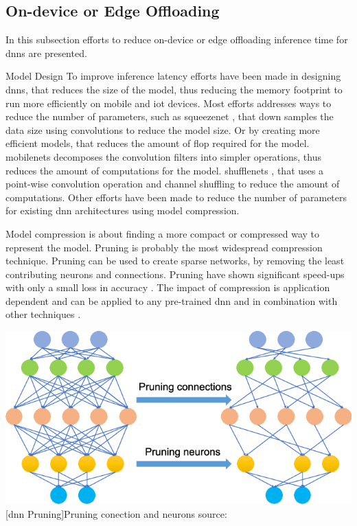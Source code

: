 \subsection{On-device or Edge Offloading}

In this subsection efforts to reduce on-device or edge offloading inference time for \gls{dnn}s are presented.

\begin{enumdescript}
	\item[Model Design] To improve inference latency efforts have been made in designing \gls{dnn}s, that reduces the size of the model, thus reducing the memory footprint to run more efficiently on mobile and \gls{iot} devices. Most efforts addresses ways to reduce the number of parameters, such as \gls{squeezenet} \cite{iandola_squeezenet:_2016}, that down samples the data size using convolutions to reduce the model size. Or by creating more efficient models, that reduces the amount of \gls{flop} required for the model. \gls{mobilenet}s \cite{howard_mobilenets:_2017,sandler_mobilenetv2:_2018} decomposes the convolution filters into simpler operations, thus reduces the amount of computations for the model. \gls{shufflenet}s \cite{zhang_shufflenet:_2017, ma_shufflenet_2018}, that uses a point-wise convolution operation and channel shuffling to reduce the amount of computations. Other efforts have been made to reduce the number of parameters for existing \gls{dnn} architectures using model compression.
	
	\item[Model compression]  is about finding a more compact or compressed way to represent the model. Pruning is probably the most widespread compression technique. Pruning can be used to create sparse networks, by removing the least contributing neurons and connections. Pruning have shown significant speed-ups with only a small loss in accuracy \cite{zhou_edge_2019}. The impact of compression is application dependent and can be applied to any pre-trained \gls{dnn} and in combination with other techniques \cite{cheng_survey_2017}.
	
	\begin{minipage}[t]{\linewidth}
		\centering
		\includegraphics[width=.4\linewidth]{figures/articles/Pruning-a-neural-network}
		[\gls{dnn} Pruning]{Pruning conection and neurons source:  \cite{chen_deep_2019}}
	\end{minipage}
	

\end{enumdescript}
